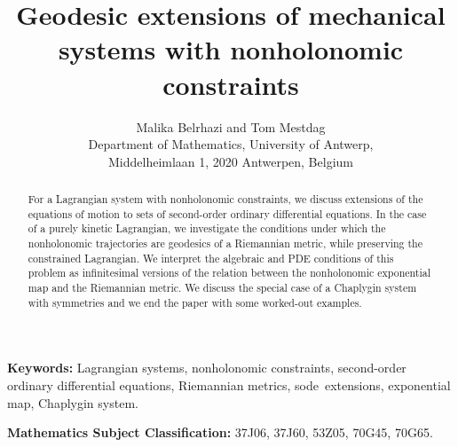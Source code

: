 \documentclass[11pt]{article}
\def\sode{{\sc sode}}
\begin{document}
\title{Geodesic extensions of mechanical systems with nonholonomic constraints}


\author{ Malika Belrhazi and Tom Mestdag \\[2mm]
	{\small Department of Mathematics,  University of Antwerp,}\\
	{\small Middelheimlaan 1, 2020 Antwerpen, Belgium}
}

\date{}

\maketitle


\begin{abstract} For a Lagrangian system with nonholonomic constraints, we {discuss} extensions of the equations of motion to  sets of second-order ordinary differential equations. In the case of a purely kinetic Lagrangian, we investigate the conditions under which the nonholonomic trajectories are geodesics of a Riemannian metric, while preserving the constrained Lagrangian. We interpret the algebraic and PDE conditions of this problem as infinitesimal versions of the relation between the nonholonomic exponential map and the Riemannian metric. We discuss  the special case of a Chaplygin system with symmetries and we end the paper with {some  worked-out examples}. 

\end{abstract}

\vspace{3mm}

\textbf{Keywords:} Lagrangian systems, nonholonomic constraints, second-order ordinary differential equations, Riemannian metrics, \sode\ extensions, exponential map, Chaplygin system.

\vspace{3mm}

\textbf{Mathematics Subject Classification:} 
37J06,
37J60,
53Z05,
70G45,
70G65.
\end{document}
